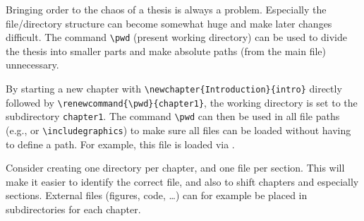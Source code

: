 
Bringing order to the chaos of a thesis is always a problem. Especially the file/directory structure can become somewhat huge and make later changes difficult. The command \verb|\pwd| (present working directory) can be used to divide the thesis into smaller parts and make absolute paths (from the main file) unnecessary.

By starting a new chapter with \verb|\newchapter{Introduction}{intro}| directly followed by \linebreak%
\verb|\renewcommand{\pwd}{chapter1}|, the working directory is set to the subdirectory \verb|chapter1|. The command \verb|\pwd| can then be used in all file paths (e.g., \verb|| or \verb|\includegraphics|) to make sure all files can be loaded without having to define a path. For example, this file is loaded via \verb||.

Consider creating one directory per chapter, and one file per section. This will make it easier to identify the correct file, and also to shift chapters and especially sections. External files (figures, code, \dots) can for example be placed in subdirectories for each chapter.





